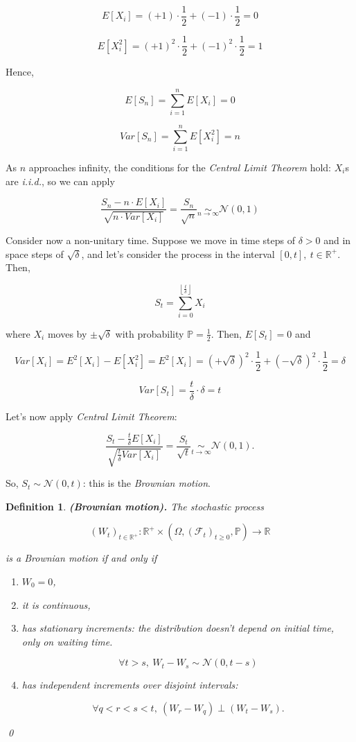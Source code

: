 \documentclass[oneside,titlepage,headinclude,12pt,a4paper,BCOR5mm,footinclude]{book}
\theoremstyle{defn}
\newtheorem{defn}{Definition}
\begin{document}
\[
  E\left[X_i\right] = (+1) \cdot \frac{1}{2} + (-1) \cdot \frac{1}{2} = 0
\]
  
\[
  E\left[X_i^2\right] = (+1)^2 \cdot \frac{1}{2} + (-1)^2 \cdot \frac{1}{2} = 1
\]

Hence,

\[
  E\left[S_n\right] = \sum_{i=1}^n E\left[X_i\right] = 0
\]

\[
  Var\left[S_n\right] = \sum_{i=1}^n E\left[X_i^2\right] = n
\]

As \(n\)  approaches infinity,  the conditions  for the  \textit{Central Limit
Theorem} hold: \(X_i\)s are \textit{i.i.d.}, so we can apply

\[
  \frac{S_n - n \cdot E\left[X_i\right]}{\sqrt{n \cdot Var\left[X_i\right]}}
  = \frac{S_n}{\sqrt{n}} \underset{n \to \infty}{\sim} \mathcal{N}(0,1)
\]

Consider now a non-unitary  time. Suppose we move in time  steps of \(\delta >
0\) and in space steps of \(\sqrt{\delta}\), and let's consider the process in
the interval $[0,t],\ t\in\mathbb{R}^+$. Then,

\[
  S_t = \sum_{i=0}^{\left\lfloor \frac{t}{\delta} \right\rfloor} X_i
\]

where     $X_i$     moves     by     $\pm\sqrt\delta$     with     probability
$\mathbb{P}=\frac{1}{2}$. Then, $E\left[S_t\right]=0$ and

\[
  Var[X_i] = E^2[X_i] - E[X_i^2] = E^2[X_i] = (+\sqrt{\delta})^2 \cdot \frac{1}{2} + (-\sqrt{\delta})^2 \cdot \frac{1}{2} 
    = \delta
\]

\[
  Var[S_t] = \frac{t}{\delta} \cdot \delta = t
\]

Let's now apply \textit{Central Limit Theorem}:

\[
  \frac{S_t - \frac{t}{\delta} E[X_i]}{\sqrt{\frac{t}{\delta} Var[X_i]}}
  = \frac{S_t}{\sqrt{t}} \underset{t \to \infty}{\sim} \mathcal{N}(0,1).
\]

So, $S_t \sim \mathcal{N}(0,t)$: this is the \textit{Brownian motion}.

\begin{defn} 
  \textbf{(Brownian motion).} The stochastic process 

  \[
    (W_t)_{t\in\mathbb{R}^+} : \mathbb{R}^+ \times (\Omega, (\mathcal{F}_t)_{t \geq 0}, \mathbb{P}) \to \mathbb{R}
  \]

  is a Brownian motion if and only if

  \begin{enumerate}[label=(\Roman*)]
    \item $W_0 = 0$,
    \item it is continuous,
    \item  has  stationary  increments:  the distribution  doesn't  depend  on
           initial time, only on waiting time.
      
      $$\forall t > s,\ W_t - W_s \sim \mathcal{N}(0,t-s)$$

    \item has independent increments over disjoint intervals: 
      
      $$\forall q < r < s < t,\ (W_r-W_q) \perp (W_t-W_s).$$
  \end{enumerate}
  \qed
\end{defn}
\end{document}
